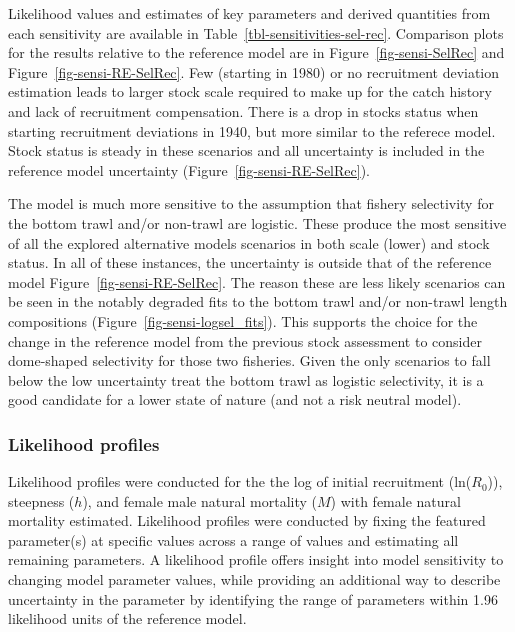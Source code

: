 \documentclass[
]{scrartcl}
\begin{document}
Likelihood values and estimates of key parameters and derived quantities
from each sensitivity are available in
Table~\ref{tbl-sensitivities-sel-rec}. Comparison plots for the results
relative to the reference model are in Figure~\ref{fig-sensi-SelRec} and
Figure~\ref{fig-sensi-RE-SelRec}. Few (starting in 1980) or no
recruitment deviation estimation leads to larger stock scale required to
make up for the catch history and lack of recruitment compensation.
There is a drop in stocks status when starting recruitment deviations in
1940, but more similar to the referece model. Stock status is steady in
these scenarios and all uncertainty is included in the reference model
uncertainty (Figure~\ref{fig-sensi-RE-SelRec}).

The model is much more sensitive to the assumption that fishery
selectivity for the bottom trawl and/or non-trawl are logistic. These
produce the most sensitive of all the explored alternative models
scenarios in both scale (lower) and stock status. In all of these
instances, the uncertainty is outside that of the reference model
Figure~\ref{fig-sensi-RE-SelRec}. The reason these are less likely
scenarios can be seen in the notably degraded fits to the bottom trawl
and/or non-trawl length compositions
(Figure~\ref{fig-sensi-logsel_fits}). This supports the choice for the
change in the reference model from the previous stock assessment to
consider dome-shaped selectivity for those two fisheries. Given the only
scenarios to fall below the low uncertainty treat the bottom trawl as
logistic selectivity, it is a good candidate for a lower state of nature
(and not a risk neutral model).

\subsubsection{Likelihood profiles}\label{likelihood-profiles-1}

Likelihood profiles were conducted for the the log of initial
recruitment (ln(\(R_0\))), steepness (\(h\)), and female male natural
mortality (\(M\)) with female natural mortality estimated. Likelihood
profiles were conducted by fixing the featured parameter(s) at specific
values across a range of values and estimating all remaining parameters.
A likelihood profile offers insight into model sensitivity to changing
model parameter values, while providing an additional way to describe
uncertainty in the parameter by identifying the range of parameters
within 1.96 likelihood units of the reference model.
\end{document}
